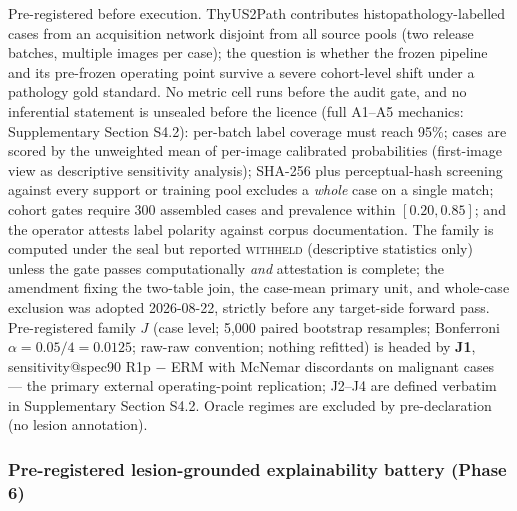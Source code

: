 \documentclass[jimh,article,submit,moreauthors,pdftex]{Definitions/tsp}
\begin{document}
Pre-registered before execution. ThyUS2Path contributes
histopathology-labelled cases from an acquisition network disjoint from
all source pools (two release batches, multiple images per case); the
question is whether the frozen pipeline and its pre-frozen operating
point survive a severe cohort-level shift under a pathology gold
standard. No metric cell runs before the audit gate, and no inferential
statement is unsealed before the licence (full A1--A5 mechanics:
Supplementary Section S4.2): per-batch label coverage must reach 95\%;
cases are scored by the unweighted mean of per-image calibrated
probabilities (first-image view as descriptive sensitivity analysis);
SHA-256 plus perceptual-hash screening against every support or
training pool excludes a \emph{whole} case on a single match; cohort
gates require 300 assembled cases and prevalence within $[0.20, 0.85]$;
and the operator attests label polarity against corpus documentation.
The family is computed under the seal but reported \textsc{withheld}
(descriptive statistics only) unless the gate passes computationally
\emph{and} attestation is complete; the amendment fixing the two-table
join, the case-mean primary unit, and whole-case exclusion was adopted
2026-08-22, strictly before any target-side forward pass.
Pre-registered family $J$ (case level; 5{,}000 paired bootstrap
resamples; Bonferroni $\alpha = 0.05/4 = 0.0125$; raw-raw convention;
nothing refitted) is headed by \textbf{J1}, sensitivity@spec90 R1p $-$
ERM with McNemar discordants on malignant cases --- the primary
external operating-point replication; J2--J4 are defined verbatim in
Supplementary Section S4.2. Oracle regimes are excluded by
pre-declaration (no lesion annotation).

\subsubsection{Pre-registered lesion-grounded explainability battery (Phase 6)}
\label{subsec:phase6_preregistered}
\end{document}

